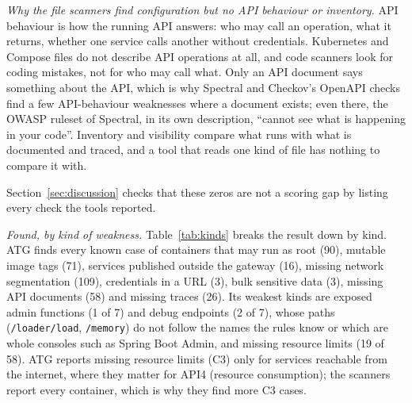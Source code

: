 \documentclass[conference]{IEEEtran}
\begin{document}
\textit{Why the file scanners find configuration but no API behaviour or inventory.} API behaviour is how the running API answers: who may call an operation, what it returns, whether one service calls another without credentials. Kubernetes and Compose files do not describe API operations at all, and code scanners look for coding mistakes, not for who may call what. Only an API document says something about the API, which is why Spectral and Checkov's OpenAPI checks find a few API-behaviour weaknesses where a document exists; even there, the OWASP ruleset of Spectral, in its own description, ``cannot see what is happening in your code''. Inventory and visibility compare what runs with what is documented and traced, and a tool that reads one kind of file has nothing to compare it with.

Section~\ref{sec:discussion} checks that these zeros are not a scoring gap by listing every check the tools reported.

\textit{Found, by kind of weakness.} Table~\ref{tab:kinds} breaks the result down by kind. ATG finds every known case of containers that may run as root (90), mutable image tags (71), services published outside the gateway (16), missing network segmentation (109), credentials in a URL (3), bulk sensitive data (3), missing API documents (58) and missing traces (26). Its weakest kinds are exposed admin functions (1 of 7) and debug endpoints (2 of 7), whose paths (\texttt{/loader/load}, \texttt{/memory}) do not follow the names the rules know or which are whole consoles such as Spring Boot Admin, and missing resource limits (19 of 58). ATG reports missing resource limits (C3) only for services reachable from the internet, where they matter for API4 (resource consumption); the scanners report every container, which is why they find more C3 cases.
\end{document}
